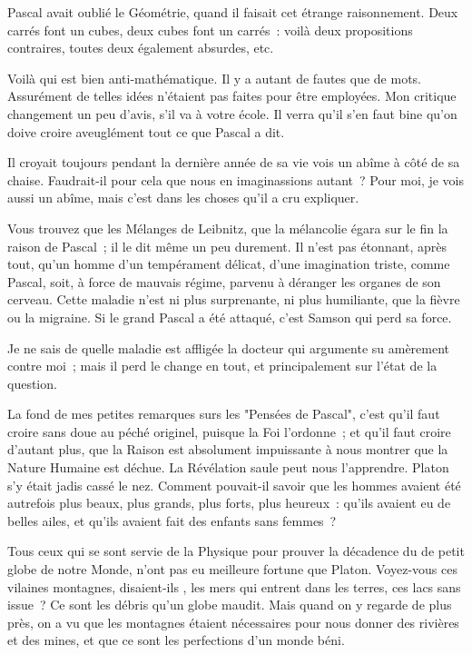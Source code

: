 \documentclass[french,twoside]{book} %
\begin{document}
Pascal avait oublié le Géométrie, quand il faisait cet étrange raisonnement. Deux carrés font un cubes, deux cubes font un carrés : voilà deux propositions contraires, toutes deux également absurdes, etc.\par
Voilà qui est bien anti-mathématique. Il y a autant de fautes que de mots. Assurément de telles idées n’étaient pas faites pour être employées. Mon critique changement un peu d’avis, s’il va à votre école. Il verra qu’il s’en faut bine qu’on doive croire aveuglément tout ce que Pascal a dit.\par
Il croyait toujours pendant la dernière année de sa vie vois un abîme à côté de sa chaise. Faudrait-il pour cela que nous en imaginassions autant ? Pour moi, je vois aussi un abîme, mais c’est dans les choses qu’il a cru expliquer.\par
Vous trouvez que les Mélanges de Leibnitz, que la mélancolie égara sur le fin la raison de Pascal ; il le dit même un peu durement. Il n’est pas étonnant, après tout, qu’un homme d’un tempérament délicat, d’une imagination triste, comme Pascal, soit, à force de mauvais régime, parvenu à déranger les organes de son cerveau. Cette maladie n’est ni plus surprenante, ni plus humiliante, que la fièvre ou la migraine. Si le grand Pascal a été attaqué, c’est Samson qui perd sa force.\par
Je ne sais de quelle maladie est affligée la docteur qui argumente su amèrement contre moi ; mais il perd le change en tout, et principalement sur l’état de la question. \par
La fond de mes petites remarques surs les "Pensées de Pascal", c’est qu’il faut croire sans doue au péché originel, puisque la Foi l’ordonne ; et qu’il faut croire d’autant plus, que la Raison est absolument impuissante à nous montrer que la Nature Humaine est déchue. La Révélation saule peut nous l’apprendre. Platon s’y était jadis cassé le nez. Comment pouvait-il savoir que les hommes avaient été autrefois plus beaux, plus grands, plus forts, plus heureux : qu’ils avaient eu de belles ailes, et qu’ils avaient fait des enfants sans femmes ?\par
Tous ceux qui se sont servie de la Physique pour prouver la décadence du de petit globe de notre Monde, n’ont pas eu meilleure fortune que Platon. Voyez-vous ces vilaines montagnes, disaient-ils , les mers qui entrent dans les terres, ces lacs sans issue ? Ce sont les débris qu’un globe maudit. Mais quand on y regarde de plus près, on a vu que les montagnes étaient nécessaires pour nous donner des rivières et des mines, et que ce sont les perfections d’un monde béni.\par
\end{document}
